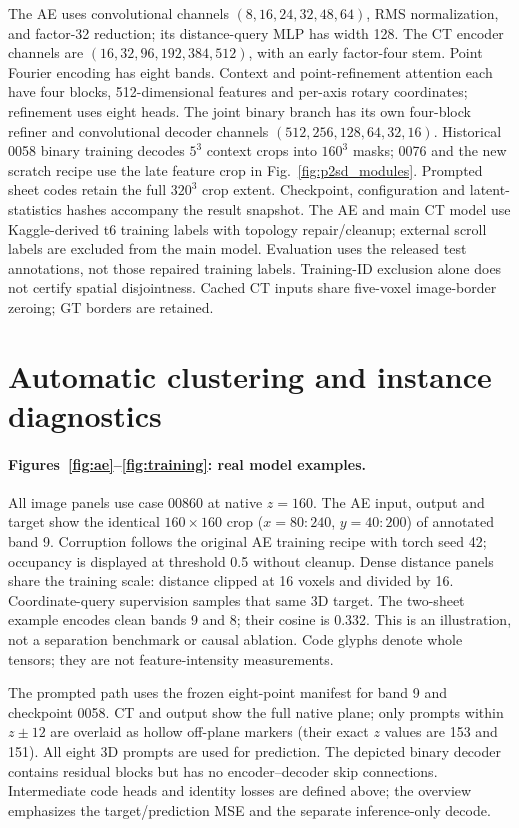 The AE uses convolutional channels $(8,16,24,32,48,64)$, RMS normalization,
and factor-32 reduction; its distance-query MLP has width 128.
The CT encoder channels are $(16,32,96,192,384,512)$, with an early
factor-four stem. Point Fourier encoding has eight bands. Context and
point-refinement attention each have four blocks, 512-dimensional features
and per-axis rotary coordinates; refinement uses eight heads.
The joint binary branch has its own four-block refiner and convolutional
decoder channels $(512,256,128,64,32,16)$. Historical 0058 binary training
decodes $5^3$ context crops into $160^3$ masks; 0076 and the new scratch recipe
use the late feature crop in Fig.~\ref{fig:p2sd_modules}. Prompted sheet codes
retain the full $320^3$ crop extent. Checkpoint, configuration and
latent-statistics hashes accompany the result snapshot.
The AE and main CT model use Kaggle-derived t6 training labels with topology
repair/cleanup; external scroll labels are excluded from the main model.
Evaluation uses the released test annotations, not those repaired training
labels. Training-ID exclusion alone does not certify spatial disjointness.
Cached CT inputs share five-voxel image-border zeroing; GT borders are retained.

\section{Automatic clustering and instance diagnostics}
\paragraph{Figures~\ref{fig:ae}--\ref{fig:training}: real model examples.}
All image panels use case 00860 at native $z=160$. The AE input, output and
target show the identical $160\times160$ crop ($x=80{:}240$, $y=40{:}200$)
of annotated band 9. Corruption follows the original AE training recipe with
torch seed 42; occupancy is displayed at threshold 0.5 without cleanup.
Dense distance panels share the training scale: distance clipped at 16 voxels
and divided by 16. Coordinate-query supervision samples that same 3D target.
The two-sheet example encodes clean bands 9 and 8; their cosine is 0.332.
This is an illustration, not a separation benchmark or causal ablation.
Code glyphs denote whole tensors; they are not feature-intensity measurements.

The prompted path uses the frozen eight-point manifest for band 9 and checkpoint
0058. CT and output show the full native plane; only prompts within $z\pm12$
are overlaid as hollow off-plane markers (their exact $z$ values are 153 and
151). All eight 3D prompts are used for prediction. The depicted binary decoder
contains residual blocks but has no encoder--decoder skip connections.
Intermediate code heads and identity losses are defined above; the overview
emphasizes the target/prediction MSE and the separate inference-only decode.

